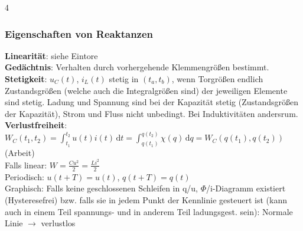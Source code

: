 \documentclass[fs, footer]{latex4ei}
\begin{document}
\begin{multicols*}{4}
{        \subsubsection{Eigenschaften von Reaktanzen}
        \textbf{Linearität}: siehe Eintore\\
        \textbf{Gedächtnis}: Verhalten durch vorhergehende Klemmengrößen bestimmt.\\
        \textbf{Stetigkeit}: $u_C(t)$, $i_L(t)$ stetig in $(t_a, t_b)$, wenn Torgrößen endlich\\
        Zustandsgrößen (welche auch die Integralgrößen sind) der jeweiligen Elemente sind stetig. Ladung und Spannung sind bei der Kapazität stetig (Zustandsgrößen der Kapazität), Strom und Fluss nicht unbedingt. Bei Induktivitäten andersrum.\\
        \textbf{Verlustfreiheit}: $W_C(t_1, t_2) = \int_{t_1}^{t_2}\! u(t)i(t)\,\mathrm dt = \int_{q(t_1)}^{q(t_2)}\! \chi(q)\,\mathrm{d}q=W_C(q(t_1), q(t_2))$ (Arbeit)\\
        Falls linear: $W = \frac{Cu^2}{2} = \frac{Li^2}{2}$\\
        Periodisch: $u(t+T) = u(t)$, $q(t+T) = q(t)$\\
        Graphisch: Falls keine geschlossenen Schleifen in q/u, $\Phi$/i-Diagramm existiert (Hysteresefrei) bzw. falls sie in jedem Punkt der Kennlinie gesteuert ist (kann auch in einem Teil spannungs- und in anderem Teil ladungsgest. sein): Normale Linie $\rightarrow$ verlustlos\\
    }

    \sectionbox{
}
\end{multicols*}
\end{document}
